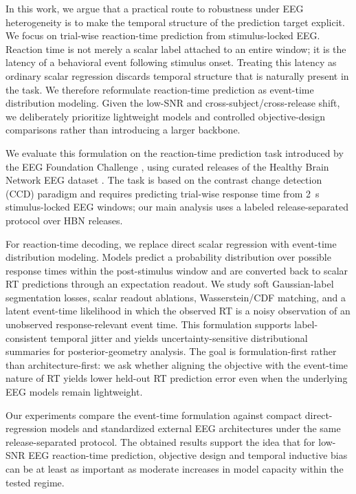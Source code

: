 \documentclass[12pt]{article}
\begin{document}
In this work, we argue that a practical route to robustness under EEG heterogeneity is to make the temporal structure of the prediction target explicit. We focus on trial-wise reaction-time prediction from stimulus-locked EEG. Reaction time is not merely a scalar label attached to an entire window; it is the latency of a behavioral event following stimulus onset. Treating this latency as ordinary scalar regression discards temporal structure that is naturally present in the task. We therefore reformulate reaction-time prediction as event-time distribution modeling. Given the low-SNR and cross-subject/cross-release shift, we deliberately prioritize lightweight models and controlled objective-design comparisons rather than introducing a larger backbone.


We evaluate this formulation on the reaction-time prediction task introduced by the EEG Foundation Challenge \citep{EEGFoundationChallengeArxiv2025,EEGChallengeWebsite2025}, using curated releases of the Healthy Brain Network EEG dataset \citep{Shirazi2024HBNEEG}. The task is based on the contrast change detection (CCD) paradigm and requires predicting trial-wise response time from 2~s stimulus-locked EEG windows; our main analysis uses a labeled release-separated protocol over HBN releases.



For reaction-time decoding, we replace direct scalar regression with event-time distribution modeling. Models predict a probability distribution over possible response times within the post-stimulus window and are converted back to scalar RT predictions through an expectation readout. We study soft Gaussian-label segmentation losses, scalar readout ablations, Wasserstein/CDF matching, and a latent event-time likelihood in which the observed RT is a noisy observation of an unobserved response-relevant event time. This formulation supports label-consistent temporal jitter and yields uncertainty-sensitive distributional summaries for posterior-geometry analysis. The goal is formulation-first rather than architecture-first: we ask whether aligning the objective with the event-time nature of RT yields lower held-out RT prediction error even when the underlying EEG models remain lightweight.

Our experiments compare the event-time formulation against compact direct-regression models and standardized external EEG architectures under the same release-separated protocol. The obtained results support the idea that for low-SNR EEG reaction-time prediction, objective design and temporal inductive bias can be at least as important as moderate increases in model capacity within the tested regime.
\end{document}
